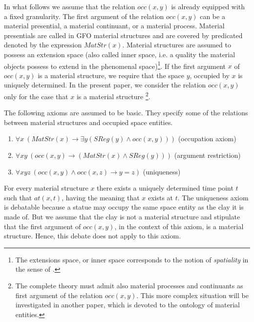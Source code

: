 \documentclass{ao2e}
\begin{document}
{In what follows we assume that the relation $occ(x,y)$ is already equipped with a fixed granularity. 
The first argument of the relation $occ(x,y)$ can be a material presential, a material continuant, or a material process. Material presentials are called in GFO material structures and are covered by predicated denoted by the expression $MatStr(x)$. Material structures are assumed to possess an extension space
(also called inner space, i.e. a quality the material objects possess to extend in the phenomenal space)\footnote{ The extensions space, or inner space corresponds to the notion of {\it spatiality} in the sense of \cite{hartmann-n-1959-a}.}. If the first argument  $x$ of $occ(x,y)$ is a material structure, we require that the space $y$, occupied by $x$ is uniquely determined.  In the present paper, we consider the relation $occ(x,y)$ only for the case that $x$ is a material structure \footnote{The complete theory must admit also material processes and continuants as first argument of the relation $occ(x,y)$. This more complex situation will be investigated in another paper, which is devoted to the ontology of material entities.}.

The following axioms are assumed to be basic. They specify some of the relations between material structures and occupied space entities.


\begin{enumerate}
	\item $\forall x\ (MatStr(x) \rightarrow \exists y (SReg(y) \wedge  occ(x,y)))$ \hfill{(occupation axiom)}
	\item $\forall x y\ (occ(x,y) \rightarrow  ( MatStr(x) \wedge SReg(y)))$ \hfill{(argument restriction)}
	\item $\forall x y z\ (occ(x, y) \wedge occ(x,z) \rightarrow y = z)$ \hfill{(uniqueness)}
\end{enumerate}

For every material structure $x$ there exists a uniquely determined time point $t$ such that $at(x,t)$, having the meaning that $x$ exists at $t$. The uniqueness axiom is debatable because a statue may occupy the same space entity as the clay it is made of. But we assume that the clay is not a material structure and stipulate that the first argument of $occ(x,y)$, in the context of this axiom, is a material structure. Hence, this debate does not apply to this axiom.



}
\end{document}
